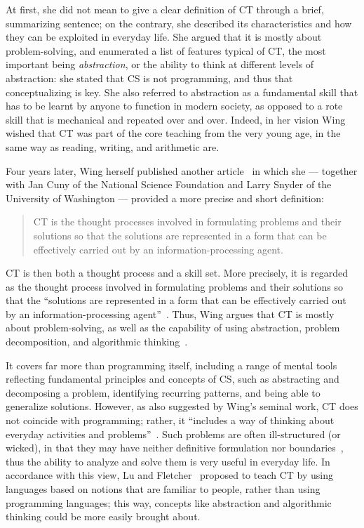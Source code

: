 At first, she did not mean to give a clear definition of \ac{CT} through a brief, summarizing sentence; on the contrary, she described its characteristics and how they can be exploited in everyday life. She argued that it is mostly about problem-solving, and enumerated a list of features typical of \ac{CT}, the most important being \emph{abstraction}, or the ability to think at different levels of abstraction: she stated that \ac{CS} is not programming, and thus that conceptualizing is key. She also referred to abstraction as a fundamental skill that has to be learnt by anyone to function in modern society, as opposed to a rote skill that is mechanical and repeated over and over. Indeed, in her vision Wing wished that \ac{CT} was part of the core teaching from the very young age, in the same way as reading, writing, and arithmetic are.

Four years later, Wing herself published another article~\cite{Wing:2010} in which she --- together with Jan Cuny of the National Science Foundation and Larry Snyder of the University of Washington --- provided a more precise and short definition:
\begin{quote}
  \ac{CT} is the thought processes involved in formulating problems and their solutions so that the solutions are represented in a form that can be effectively carried out by an information-processing agent.
\end{quote}

\ac{CT} is then both a thought process and a skill set. More precisely, it is regarded as the thought process involved in formulating problems and their solutions so that the ``solutions are represented in a form that can be effectively carried out by an information-processing agent''~\cite{Wing:2010}. Thus, Wing argues that \ac{CT} is mostly about problem-solving, as well as the capability of using abstraction, problem decomposition, and algorithmic thinking~\cite{Wing:2010,Voogt:2015,Moreno:2012}.

It covers far more than programming itself, including a range of mental tools reflecting fundamental principles and concepts of \ac{CS}, such as abstracting and decomposing a problem, identifying recurring patterns, and being able to generalize solutions. However, as also suggested by Wing's seminal work, \ac{CT} does not coincide with programming; rather, it ``includes a way of thinking about everyday activities and problems''~\cite{Shute:2017}. Such problems are often ill-structured (or wicked), in that they may have neither definitive formulation nor boundaries~\cite{Fischer:2017}, thus the ability to analyze and solve them is very useful in everyday life. In accordance with this view, Lu and Fletcher~\cite{Lu:2009} proposed to teach \ac{CT} by using languages based on notions that are familiar to people, rather than using programming languages; this way, concepts like abstraction and algorithmic thinking could be more easily brought about.

